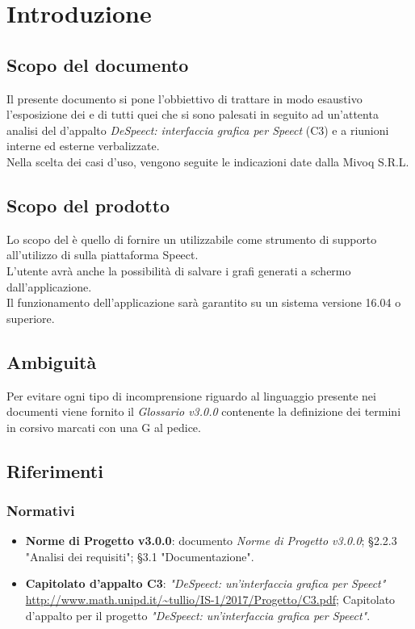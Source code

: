 \documentclass[./AnalisideiRequisiti.tex]{subfiles}
\begin{document}
	
\chapter{Introduzione}
\section{Scopo del documento}
Il presente documento si pone l’obbiettivo di trattare in modo esaustivo l’esposizione dei  e di tutti quei  che si sono palesati in seguito ad un’attenta analisi del  d’appalto \textit{DeSpeect: interfaccia grafica per Speect} (C3) e a riunioni interne ed esterne verbalizzate.
\\ \noindent Nella scelta dei casi d'uso, vengono seguite le indicazioni date dalla  Mivoq S.R.L.

\section{Scopo del prodotto}

Lo scopo del  è quello di fornire un  utilizzabile come strumento di supporto all'utilizzo di  sulla piattaforma Speect. 
\\ \noindent L'utente avrà anche la possibilità di salvare i grafi generati a schermo dall'applicazione.
\\ \noindent Il funzionamento dell'applicazione sarà garantito su un sistema  versione 16.04 o superiore.

\section{Ambiguità}
Per evitare ogni tipo di incomprensione riguardo al linguaggio presente nei documenti viene fornito il \textit{Glossario v3.0.0} contenente la definizione dei termini in corsivo marcati con una G al pedice.

\section{Riferimenti}
\subsection*{Normativi}
\begin{itemize}
	\item \textbf{Norme di Progetto v3.0.0}: documento \textit{Norme di Progetto v3.0.0};
	\subitem §2.2.3 "Analisi dei requisiti";
	\subitem §3.1 "Documentazione".
	\item \textbf{Capitolato d'appalto C3}: \textit{"DeSpeect: un'interfaccia grafica per Speect"} \url{http://www.math.unipd.it/~tullio/IS-1/2017/Progetto/C3.pdf};
	\subitem Capitolato d'appalto per il progetto \textit{"DeSpeect: un'interfaccia grafica per Speect"}.

\end{itemize}
\end{document}

